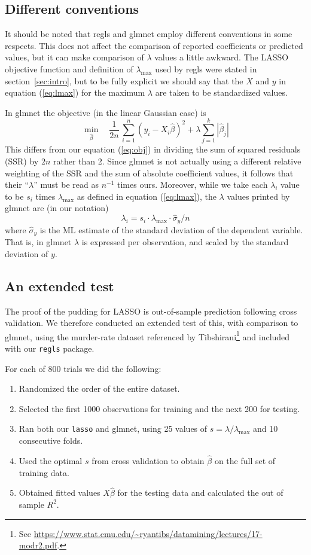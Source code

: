 \documentclass{article}
\begin{document}
\subsection*{Different conventions}

It should be noted that \textsf{regls} and \textsf{glmnet} employ
different conventions in some respects. This does not affect the
comparison of reported coefficients or predicted values, but it can
make comparison of $\lambda$ values a little awkward. The LASSO
objective function and definition of $\lambda_{\max}$ used by
\textsf{regls} were stated in section~\ref{sec:intro}, but to be fully
explicit we should say that the $X$ and $y$ in equation
(\ref{eq:lmax}) for the maximum $\lambda$ are taken to be standardized
values.

In \textsf{glmnet} the objective (in the linear Gaussian case) is
\[
   \min_{\hat{\beta}} \quad \frac{1}{2n}\,
  \sum_{i=1}^n (y_i - X_i\hat{\beta})^2 + \lambda \sum_{j=1}^k |\hat{\beta}_j| 
\]
This differs from our equation (\ref{eq:obj}) in dividing the sum of
squared residuals (SSR) by $2n$ rather than 2. Since \textsf{glmnet}
is not actually using a different relative weighting of the SSR and
the sum of absolute coefficient values, it follows that their
``$\lambda$'' must be read as $n^{-1}$ times ours. Moreover, while we
take each $\lambda_i$ value to be $s_i$ times $\lambda_{\max}$ as
defined in equation (\ref{eq:lmax}), the $\lambda$ values printed by
\textsf{glmnet} are (in our notation)
\[
\lambda_i = s_i \cdot \lambda_{\max} \cdot \hat{\sigma}_y / n 
\]
where $\hat{\sigma}_y$ is the ML estimate of the standard deviation of
the dependent variable. That is, in \textsf{glmnet} $\lambda$ is
expressed per observation, and scaled by the standard deviation of
$y$.

\subsection*{An extended test}

The proof of the pudding for LASSO is out-of-sample prediction
following cross validation. We therefore conducted an extended test of
this, with comparison to \textsf{glmnet}, using the murder-rate
dataset referenced by Tibshirani\footnote{See
  \url{https://www.stat.cmu.edu/~ryantibs/datamining/lectures/17-modr2.pdf}.}
and included with our \texttt{regls} package.

For each of 800 trials we did the following:
\begin{enumerate}
\item Randomized the order of the entire dataset.
\item Selected the first 1000 observations for training and the next
  200 for testing.
\item Ran both our \texttt{lasso} and \textsf{glmnet}, using 25 values
  of $s = \lambda/\lambda_{\max}$ and 10 consecutive folds.
\item Used the optimal $s$ from cross validation to obtain
  $\hat{\beta}$ on the full set of training data.
\item Obtained fitted values $X\hat{\beta}$ for the testing data and
  calculated the out of sample $R^2$.
\end{enumerate}
\end{document}
